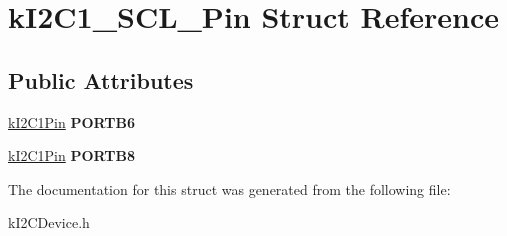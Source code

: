 \hypertarget{structkI2C1__SCL__Pin}{}\section{k\+I2\+C1\+\_\+\+S\+C\+L\+\_\+\+Pin Struct Reference}
\label{structkI2C1__SCL__Pin}
\subsection*{Public Attributes}
\begin{DoxyCompactItemize}
\item 
\hyperlink{structkI2C1Pin}{k\+I2\+C1\+Pin} {\bfseries P\+O\+R\+T\+B6}\hypertarget{structkI2C1__SCL__Pin_a96c689a70a9927126b5f618ee54c35c0}{}\label{structkI2C1__SCL__Pin_a96c689a70a9927126b5f618ee54c35c0}

\item 
\hyperlink{structkI2C1Pin}{k\+I2\+C1\+Pin} {\bfseries P\+O\+R\+T\+B8}\hypertarget{structkI2C1__SCL__Pin_a35776252a186ae83a64ef260eca65a4a}{}\label{structkI2C1__SCL__Pin_a35776252a186ae83a64ef260eca65a4a}

\end{DoxyCompactItemize}


The documentation for this struct was generated from the following file\+:\begin{DoxyCompactItemize}
\item 
k\+I2\+C\+Device.\+h\end{DoxyCompactItemize}
